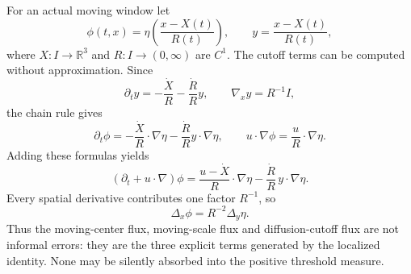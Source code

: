 \documentclass[11pt]{article}
\theoremstyle{definition}\newtheorem{definition}[theorem]{Definition}
\theoremstyle{remark}\newtheorem{remark}[theorem]{Remark}
\newcommand{\R}{\mathbb R}\newcommand{\dd}{\,d}\newcommand{\HH}{\mathcal H}
\begin{document}
For an actual moving window let
\[
\phi(t,x)=\eta\!\left(\frac{x-X(t)}{R(t)}\right),
\qquad
y=\frac{x-X(t)}{R(t)},
\]
where $X:I\to\R^3$ and $R:I\to(0,\infty)$ are $C^1$.  The cutoff terms can
be computed without approximation.  Since
\[
\partial_t y
=-\frac{\dot X}{R}-\frac{\dot R}{R}y,
\qquad
\nabla_x y=R^{-1}I,
\]
the chain rule gives
\[
\partial_t\phi
=-\frac{\dot X}{R}\cdot\nabla\eta
-\frac{\dot R}{R}y\cdot\nabla\eta,
\qquad
u\cdot\nabla\phi
=\frac{u}{R}\cdot\nabla\eta.
\]
Adding these formulas yields
\[
(\partial_t+u\cdot\nabla)\phi
=
\frac{u-\dot X}{R}\cdot\nabla\eta
-\frac{\dot R}{R}\,y\cdot\nabla\eta.
\]
Every spatial derivative contributes one factor $R^{-1}$, so
\[
\Delta_x\phi=R^{-2}\Delta_y\eta.
\]
Thus the moving-center flux, moving-scale flux and diffusion-cutoff flux are
not informal errors: they are the three explicit terms generated by the
localized identity.  None may be silently absorbed into the positive
threshold measure.
\end{document}
